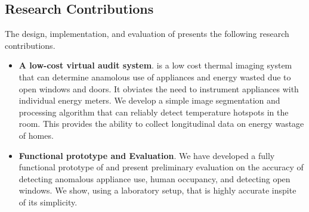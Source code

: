 \subsection*{Research Contributions}

The design, implementation, and evaluation of {\IRLeak} presents 
the following research contributions.

\begin{itemize}
	
 \item {\bf A low-cost virtual audit system}. {\IRLeak} is a low cost thermal imaging system that can determine anamolous use of appliances and energy wasted due to open windows and doors. It obviates the need to 
 instrument appliances with individual energy meters. We develop a simple
 image segmentation and processing algorithm that can reliably detect
 temperature hotspots in the room. This provides the ability to collect
 longitudinal data on energy wastage of homes.
 
 \item {\bf Functional prototype and Evaluation}. We have developed a
 fully functional prototype of {\IRLeak} and present preliminary evaluation
 on the accuracy of detecting anomalous appliance use, human occupancy, and detecting open windows. We show, using a laboratory setup,
 that {\IRLeak} is highly accurate inspite of its simplicity.



 \end{itemize}



